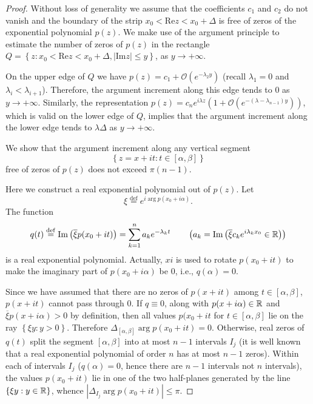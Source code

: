 \begin{proof}
  Without loss of generality we assume that the coefficients $c_1$ and $c_2$ do not vanish and the boundary of the strip $x_0<\mathrm{Re}z<x_0+\Delta$ is free of zeros of the exponential polynomial $p(z)$. We make use of the argument principle to estimate the number of zeros of $p(z)$ in the rectangle $Q=\left\{ z:x_0<\mathrm{Re}z<x_0+\Delta, \left| \mathrm{Im}z \right| \le y \right\} $, as $y\to +\infty$.

  On the upper edge of $Q$ we have $p(z)=c_1+\mathcal{O}\left( e^{-\lambda_2y} \right) $ (recall  $\lambda_1=0$ and $\lambda_i<\lambda_{i+1}$). Therefore, the argument increment along this edge tends to $0$ as $y\to+\infty$. Similarly, the representation $p(z)=c_ne^{i\lambda z}\left( 1+\mathcal{O}\left( e^{-(\lambda-\lambda_{n-1})y}\right)\right) $, which is valid on the lower edge of $Q$, implies that the argument increment along the lower edge tends to $\lambda \Delta$ as $y\to +\infty$.

  We show that the argument increment along any vertical segment
  $$\left\{ z=x+it:t\in \left[ \alpha,\beta \right]  \right\} $$
  free of zeros of $p(z)$ does not exceed $\pi(n-1)$. 
  

  Here we construct a real exponential polynomial out of $p(z)$. Let
  $$\xi\overset{\mathrm{def}}{=}e^{i\arg p(x_0+i\alpha)}.$$ 
  The function 
  \[
    q(t)\overset{\mathrm{def}}{=}\mathrm{Im} \left(\overline{\xi}p(x_0+it)\right)=\sum_{k=1}^{n} a_k e^{-\lambda_kt}\qquad \left( a_k=\mathrm{Im} \left( \overline{\xi}c_k e^{i\lambda_kx_0}\in \mathbb{R} \right)  \right) 
  \] 
  is a real exponential polynomial. Actually, $xi$ is used to rotate  $p(x_0+it)$ to make the imaginary part of $p(x_0+i\alpha)$ be $0$, i.e.,  $q(\alpha)=0$. 

  Since we have assumed that there are no zeros of $p(x+it)$ among $t\in [\alpha,\beta]$, $p(x+it)$ cannot pass through $0$. If $q\equiv 0$, along with $p(x+i\alpha)\in \mathbb{R}$ and  $ \overline{\xi}p(x+i\alpha)>0$ by definition, then all values $p(x_0+it$ for $t\in [\alpha,\beta]$ lie on the ray $\left\{ \xi y: y>0 \right\} $.
  Therefore $\Delta_{[\alpha,\beta]}\arg p(x_0+it)=0$. Otherwise, real zeros of $q(t)$ split the segment $\left[ \alpha,\beta \right] $ into at most $n-1$ intervals $I_{j}$ (it is well known that a real exponential polynomial of order $n$ has at most $n-1$ zeros). Within each of intervals $I_j$ ($q(\alpha)=0$, hence there are $n-1$ intervals not $n$ intervals), the values $p(x_0+it)$ lie in one of the two half-planes generated by the line $\left\{ \xi y :y \in \mathbb{R} \right\} $, whence $\left| \Delta_{I_j}\arg p(x_0+it) \right| \le \pi$. 



\end{proof}
